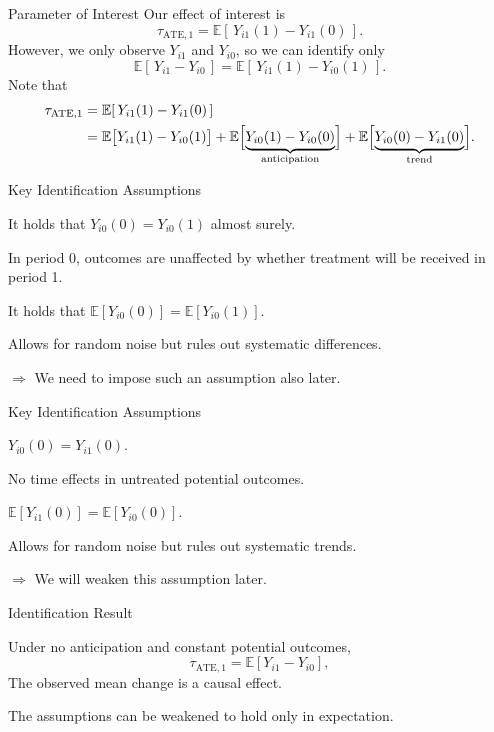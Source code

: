 \documentclass[11pt,aspectratio=169]{beamer}
\newcommand{\E}{\mathbb{E}}
\begin{document}
\begin{frame}{Parameter of Interest}
Our effect of interest is
\[\tau_{\text{ATE},1}=\E[\,Y_{i1}(1)-Y_{i1}(0)\,].\]
However, we only observe $Y_{i1}$ and $Y_{i0}$, so we can identify only
\[\E[\,Y_{i1}-Y_{i0}\,]=\E[\,Y_{i1}(1)-Y_{i0}(1)\,].\]
Note that
\[
\begin{aligned}
  \tau_{\text{ATE},1}&=\E[\,Y_{i1}(1)-Y_{i1}(0)\,]\\
  &=\E\bigl[Y_{i1}(1)-Y_{i0}(1)\bigr]
    +\E\Bigl[\underbrace{Y_{i0}(1)-Y_{i0}(0)}_{\text{anticipation}}\Bigr]
    +\E\Bigl[\underbrace{Y_{i0}(0)-Y_{i1}(0)}_{\text{trend}}\Bigr].
\end{aligned}
\]
\end{frame}

\begin{frame}{Key Identification Assumptions}
\begin{definitionbox}[No anticipation]
It holds that $Y_{i0}(0)=Y_{i0}(1)$ almost surely.
\end{definitionbox}
In period 0, outcomes are unaffected by whether treatment will be received in period 1.

\begin{definitionbox}
It holds that $\E[Y_{i0}(0)]=\E[Y_{i0}(1)]$.
\end{definitionbox}
Allows for random noise but rules out systematic differences.

\medskip
$\Rightarrow$ We need to impose such an assumption also later.
\end{frame}

\begin{frame}{Key Identification Assumptions}
\begin{definitionbox}
$Y_{i0}(0)=Y_{i1}(0)$.
\end{definitionbox}
No time effects in untreated potential outcomes.

\begin{definitionbox}
$\E[Y_{i1}(0)]=\E[Y_{i0}(0)]$.
\end{definitionbox}
Allows for random noise but rules out systematic trends.

\medskip
$\Rightarrow$ We will weaken this assumption later.
\end{frame}

\begin{frame}{Identification Result}
\begin{theorembox}
Under no anticipation and constant potential outcomes,
\[\tau_{\text{ATE},1}=\E[Y_{i1}-Y_{i0}],\]
The observed mean change is a causal effect.
\end{theorembox}
The assumptions can be weakened to hold only in expectation.
\end{frame}
\end{document}
